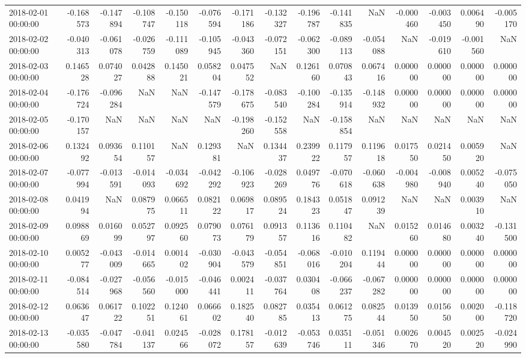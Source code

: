\begin{tabular}{lrrrrrrrrrrrrrr}
2018-02-01 00:00:00 & -0.168573 & -0.147894 & -0.108747 & -0.150118 & -0.076594 & -0.171186 & -0.132327 & -0.196787 & -0.141835 & NaN & -0.000460 & -0.003450 & 0.006490 & -0.005170 \\
2018-02-02 00:00:00 & -0.040313 & -0.061078 & -0.026759 & -0.111089 & -0.105945 & -0.043360 & -0.072151 & -0.062300 & -0.089113 & -0.054088 & NaN & -0.019610 & -0.001560 & NaN \\
2018-02-03 00:00:00 & 0.146528 & 0.074027 & 0.042888 & 0.145021 & 0.058204 & 0.047552 & NaN & 0.126160 & 0.070843 & 0.067416 & 0.000000 & 0.000000 & 0.000000 & 0.000000 \\
2018-02-04 00:00:00 & -0.176724 & -0.096284 & NaN & NaN & -0.147579 & -0.178675 & -0.083540 & -0.100284 & -0.135914 & -0.148932 & 0.000000 & 0.000000 & 0.000000 & 0.000000 \\
2018-02-05 00:00:00 & -0.170157 & NaN & NaN & NaN & NaN & -0.198260 & -0.152558 & NaN & -0.158854 & NaN & NaN & NaN & NaN & NaN \\
2018-02-06 00:00:00 & 0.132492 & 0.093654 & 0.110157 & NaN & 0.129381 & NaN & 0.134437 & 0.239922 & 0.117957 & 0.119618 & 0.017550 & 0.021450 & 0.005920 & NaN \\
2018-02-07 00:00:00 & -0.077994 & -0.013591 & -0.014093 & -0.034692 & -0.042292 & -0.106923 & -0.028269 & 0.049776 & -0.070618 & -0.060638 & -0.004980 & -0.008940 & 0.005240 & -0.075050 \\
2018-02-08 00:00:00 & 0.041994 & NaN & 0.087975 & 0.066511 & 0.082122 & 0.069817 & 0.089524 & 0.184323 & 0.051847 & 0.091239 & NaN & NaN & 0.003910 & NaN \\
2018-02-09 00:00:00 & 0.098869 & 0.016099 & 0.052797 & 0.092560 & 0.079073 & 0.076179 & 0.091357 & 0.113616 & 0.110482 & NaN & 0.015260 & 0.014680 & 0.003240 & -0.131500 \\
2018-02-10 00:00:00 & 0.005277 & -0.043009 & -0.014665 & 0.001402 & -0.030904 & -0.043579 & -0.054851 & -0.068016 & -0.010204 & 0.119444 & 0.000000 & 0.000000 & 0.000000 & 0.000000 \\
2018-02-11 00:00:00 & -0.084514 & -0.027968 & -0.056560 & -0.015000 & -0.046441 & 0.002411 & -0.037764 & 0.030408 & -0.066237 & -0.067282 & 0.000000 & 0.000000 & 0.000000 & 0.000000 \\
2018-02-12 00:00:00 & 0.063647 & 0.061722 & 0.102251 & 0.124061 & 0.066602 & 0.182540 & 0.082785 & 0.035413 & 0.061275 & 0.082544 & 0.013950 & 0.015650 & 0.002000 & -0.118720 \\
2018-02-13 00:00:00 & -0.035580 & -0.047784 & -0.041137 & 0.024566 & -0.028072 & 0.178157 & -0.012639 & -0.053746 & 0.035111 & -0.051346 & 0.002670 & 0.004520 & 0.002520 & -0.024990 \\

\end{tabular}
